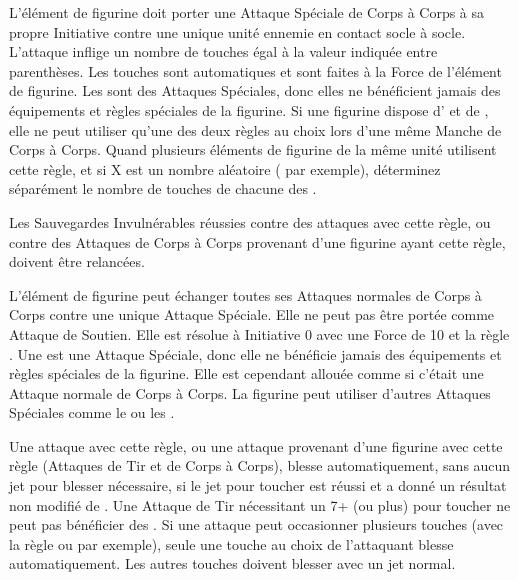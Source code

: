 
L'élément de figurine doit porter une Attaque Spéciale de Corps à Corps à sa propre Initiative contre une unique unité ennemie en contact socle à socle. L'attaque inflige un nombre de touches égal à la valeur indiquée entre parenthèses. Les touches sont automatiques et sont faites à la Force de l'élément de figurine. Les \grindingattacks{} sont des Attaques Spéciales, donc elles ne bénéficient jamais des équipements et règles spéciales de la figurine. Si une figurine dispose d'\grindingattacks{} et de \impacthits{}, elle ne peut utiliser qu'une des deux règles au choix lors d'une même Manche de Corps à Corps. Quand plusieurs éléments de figurine de la même unité utilisent cette règle, et si X est un nombre aléatoire ( par exemple), déterminez séparément le nombre de touches de chacune des \grindingattacks{}.


Les Sauvegardes Invulnérables réussies contre des attaques avec cette règle, ou contre des Attaques de Corps à Corps provenant d'une figurine ayant cette règle, doivent être relancées.


L'élément de figurine peut échanger toutes ses Attaques normales de Corps à Corps contre une unique Attaque Spéciale. Elle ne peut pas être portée comme Attaque de Soutien. Elle est résolue à Initiative 0 avec une Force de 10 et la règle . Une \crushattack{} est une Attaque Spéciale, donc elle ne bénéficie jamais des équipements et règles spéciales de la figurine. Elle est cependant allouée comme si c'était une Attaque normale de Corps à Corps. La figurine peut utiliser d'autres Attaques Spéciales comme le \stomp{} ou les \impacthits{}.


Une attaque avec cette règle, ou une attaque provenant d'une figurine avec cette règle (Attaques de Tir et de Corps à Corps), blesse automatiquement, sans aucun jet pour blesser nécessaire, si le jet pour toucher est réussi et a donné un résultat non modifié de . Une Attaque de Tir nécessitant un 7+ (ou plus) pour toucher ne peut pas bénéficier des \poisonedattacks{}. Si une attaque peut occasionner plusieurs touches (avec la règle \areaattack{} ou \penetrating{} par exemple), seule une touche au choix de l'attaquant blesse automatiquement. Les autres touches doivent blesser avec un jet normal.

